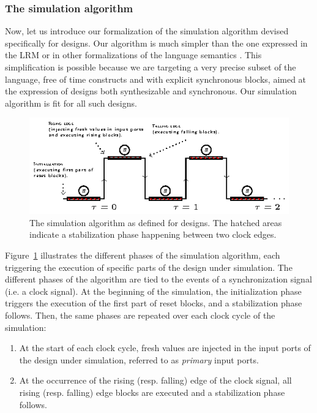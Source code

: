 \documentclass[pdflatex,sn-mathphys]{sn-jnl}%
\theoremstyle{thmstyleone}%
\theoremstyle{thmstyletwo}%
\theoremstyle{thmstylethree}%
\begin{document}
\subsubsection{The simulation algorithm}
\label{subsubsec:sim-algo}

Now, let us introduce our formalization of the simulation algorithm
devised specifically for \hvhdl{} designs. Our algorithm is much
simpler than the one expressed in the \vhdl{} LRM \cite{VHDL2000} or in
other formalizations of the \vhdl{} language
semantics \cite{Borger1995}. This simplification is possible because we
are targeting a very precise subset of the language, free of time
constructs and with explicit synchronous blocks, aimed at the
expression of designs both synthesizable and synchronous. Our
simulation algorithm is fit for all such designs.

\begin{figure}[h]
  \centering
  \includegraphics[keepaspectratio,width=\textwidth]{sim-alg.eps}
  \caption{The simulation algorithm as defined for \hvhdl{}
    designs. The hatched areas indicate a stabilization phase
    happening between two clock edges. }
  \label{fig:sim-alg}
\end{figure}

Figure~\ref{fig:sim-alg} illustrates the different phases of the
\hvhdl{} simulation algorithm, each triggering the execution of
specific parts of the design under simulation. The different phases of
the algorithm are tied to the events of a synchronization signal
(i.e. a clock signal). At the beginning of the simulation, the
initialization phase triggers the execution of the first part of reset
blocks, and a stabilization phase follows. Then, the same phases are
repeated over each clock cycle of the simulation:

\begin{enumerate}
\item At the start of each clock cycle, fresh values are injected in
  the input ports of the design under simulation, referred to as
  \textit{primary} input ports.
\item At the occurrence of the rising (resp. falling) edge of the
  clock signal, all rising (resp. falling) edge blocks are executed
  and a stabilization phase follows.  
\end{enumerate}
\end{document}
